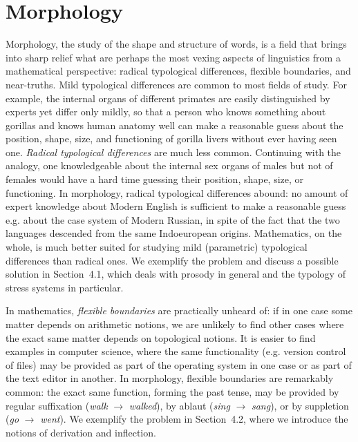 \chapter{Morphology}

Morphology, the study of the shape and structure of words, is a field that
brings into sharp relief what are perhaps the most vexing aspects of
linguistics from a mathematical perspective: radical typological differences,
flexible boundaries, and near-truths. Mild typological differences are common
to most fields of study. For example, the internal organs of different
primates are easily distinguished by experts yet differ only mildly, so that a
person who knows something about gorillas and knows human anatomy well can
make a reasonable guess about the position, shape, size, and functioning of
gorilla livers without ever having seen one.  {\it Radical typological
  differences} are much less common. Continuing with the analogy, one
knowledgeable about the internal sex organs of males but not of females would
have a hard time guessing their position, shape, size, or functioning.  In
morphology, radical typological differences abound: no amount of expert
knowledge about Modern English is sufficient to make a reasonable guess e.g.
about the case system of Modern Russian, in spite of the fact that the two
languages descended from the same Indoeuropean origins.  Mathematics, on the
whole, is much better suited for studying mild (parametric) typological
differences than radical ones. We exemplify the problem and discuss a possible
solution in Section~4.1, which deals with prosody in general and the typology
of stress systems in particular.

In mathematics, {\it flexible boundaries} are practically unheard of: if in
one case some matter depends on arithmetic notions, we are unlikely to find
other cases where the exact same matter depends on topological notions. It is
easier to find examples in computer science, where the same functionality
(e.g. version control of files) may be provided as part of the operating system
in one case or as part of the text editor in another. In morphology, flexible
boundaries are remarkably common: the exact same function, forming the past 
tense, may be provided by regular suffixation ({\it walk} $\rightarrow$ {\it 
walked}), by ablaut ({\it sing} $\rightarrow$ {\it sang}), or by suppletion
({\it go} $\rightarrow$ {\it went}). We exemplify the problem in Section~4.2, where 
we introduce the notions of derivation and inflection.

